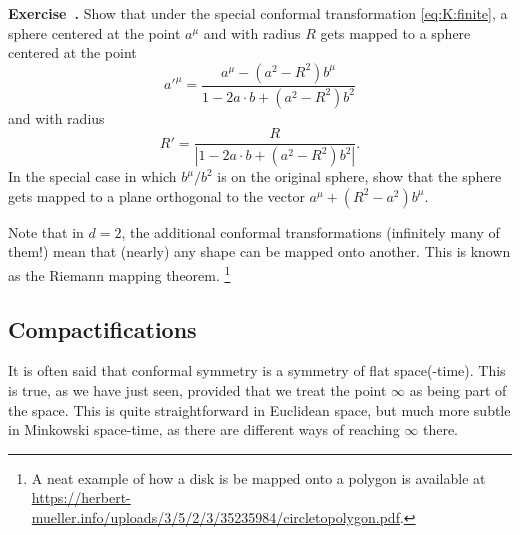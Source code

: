 \documentclass[a4paper,12pt]{article}
\numberwithin{equation}{section}
\newcounter{exercise}[section]
\newenvironment{exercise}[1][]%
	{\refstepcounter{exercise}\bigskip
	\begin{mdframed}[backgroundcolor=gray!20, linewidth=0]
	\noindent\textbf{Exercise~\thesection.\theexercise #1} \rmfamily}
  	{\end{mdframed}\bigskip}
\begin{document}
\begin{exercise}
	Show that under the special conformal transformation \eqref{eq:K:finite}, a sphere centered at the point $a^\mu$ and with radius $R$ gets mapped to a sphere centered at the point 
	$$
	a'^\mu = \frac{a^\mu - (a^2 - R^2) b^\mu}
	{1 - 2 a \cdot b + (a^2 - R^2) b^2}
	$$
	and with radius
	$$
	R' = \frac{R}{\left| 1 - 2 a \cdot b + (a^2 - R^2) b^2 \right|}.
	$$
	In the special case in which $b^\mu / b^2$ is on the original sphere, show that the sphere gets mapped to a plane orthogonal to the vector $a^\mu + (R^2 - a^2) b^\mu$.
	
\end{exercise}

Note that in $d = 2$, the additional conformal transformations (infinitely many of them!) mean that (nearly) any shape can be mapped onto another. This is known as the Riemann mapping theorem.%
%
\footnote{A neat example of how a disk is be mapped onto a polygon is available at \\
\url{https://herbert-mueller.info/uploads/3/5/2/3/35235984/circletopolygon.pdf}.}


\subsection{Compactifications}

It is often said that conformal symmetry is a symmetry of flat space(-time).
This is true, as we have just seen, provided that we treat the point $\infty$ as being part of the space.
This is quite straightforward in Euclidean space, but much more subtle in Minkowski space-time, as there are different ways of reaching $\infty$ there.
\end{document}
